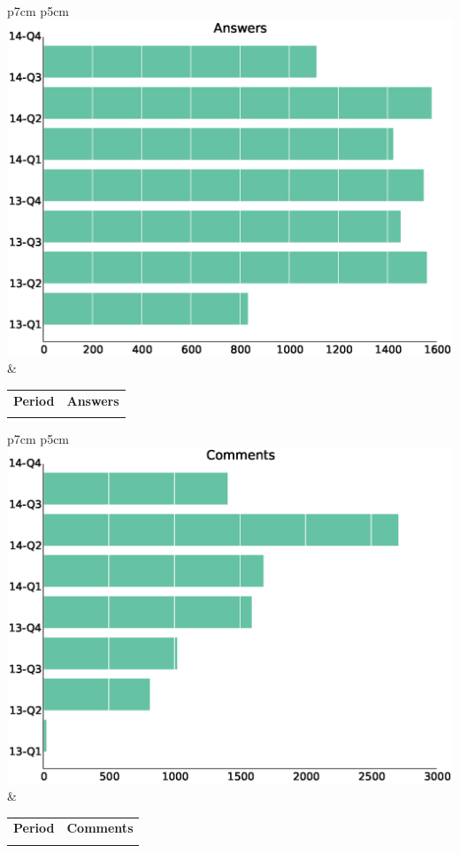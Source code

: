 \documentclass[a4wide,11pt]{report}
\begin{document}
\begin{tabular}{p{7cm} p{5cm}}
    \vspace{0pt} 
    \includegraphics[scale=.35]{figs/answers.eps}
    & 
    \vspace{0pt}
    \begin{tabular}{l|l}%
    \bfseries Period & \bfseries Answers %
    \csvreader[head to column names]{data/answers.csv}{}%
    {\\ & \answers}
    \end{tabular}
\end{tabular}

\begin{tabular}{p{7cm} p{5cm}}
    \vspace{0pt} 
    \includegraphics[scale=.35]{figs/comments.eps}
    & 
    \vspace{0pt}
    \begin{tabular}{l|l}%
    \bfseries Period & \bfseries Comments %
    \csvreader[head to column names]{data/comments.csv}{}%
    {\\ & \comments}
    \end{tabular}
\end{tabular}
\end{document}
